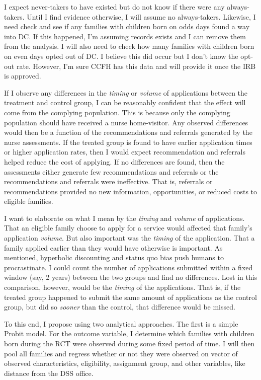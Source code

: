 \documentclass[12pt,letterpaperpaper,]{book}
\begin{document}
I expect never-takers to have existed but do not know if there were any
always-takers. Until I find evidence otherwise, I will assume no
always-takers. Likewise, I need check and see if any families with
children born on odds days found a way into DC. If this happened, I'm
assuming records exists and I can remove them from the analysis. I will
also need to check how many families with children born on even days
opted out of DC. I believe this did occur but I don't know the opt-out
rate. However, I'm sure CCFH has this data and will provide it once the
IRB is approved.

If I observe any differences in the \emph{timing} or \emph{volume} of
applications between the treatment and control group, I can be
reasonably confident that the effect will come from the complying
population. This is because only the complying population should have
received a nurse home-visitor. Any observed differences would then be a
function of the recommendations and referrals generated by the nurse
assessments. If the treated group is found to have earlier application
times or higher application rates, then I would expect recommendation
and referrals helped reduce the cost of applying. If no differences are
found, then the assessments either generate few recommendations and
referrals or the recommendations and referrals were ineffective. That
is, referrals or recommendations provided no new information,
opportunities, or reduced costs to eligible families.

I want to elaborate on what I mean by the \emph{timing} and
\emph{volume} of applications. That an eligible family choose to apply
for a service would affected that family's application \emph{volume}.
But also important was the \emph{timing} of the application. That a
family applied earlier than they would have otherwise is important. As
mentioned, hyperbolic discounting and status quo bias push humans to
procrastinate. I could count the number of applications submitted within
a fixed window (say, 2 years) between the two groups and find no
differences. Lost in this comparison, however, would be the
\emph{timing} of the applications. That is, if the treated group
happened to submit the same amount of applications as the control group,
but did so \emph{sooner} than the control, that difference would be
missed.

To this end, I propose using two analytical approaches. The first is a
simple Probit model. For the outcome variable, I determine which
families with children born during the RCT were observed during some
fixed period of time. I will then pool all families and regress whether
or not they were observed on vector of observed characteristics,
eligibility, assignment group, and other variables, like distance from
the DSS office.
\end{document}
